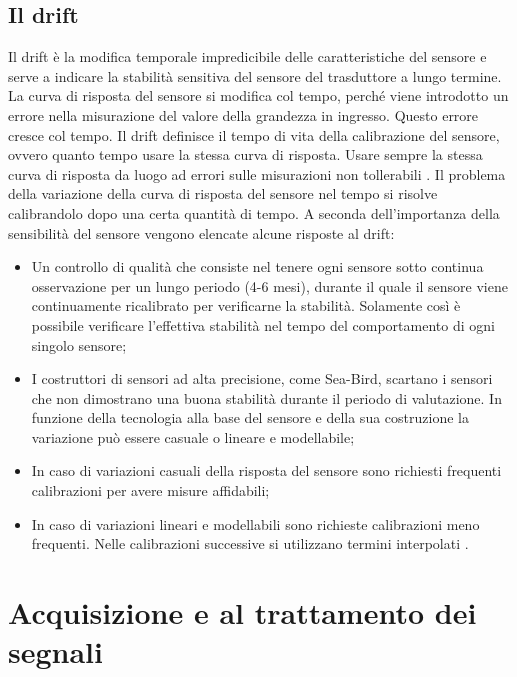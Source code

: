 \documentclass[a4paper]{report} %
\begin{document}
\subsection{Il drift}
Il drift è la modifica temporale impredicibile delle caratteristiche del sensore e serve a indicare la stabilità sensitiva del sensore del trasduttore a lungo termine. La curva di risposta del sensore si modifica col tempo, perché viene introdotto un errore nella misurazione del valore della grandezza in ingresso. Questo errore cresce col tempo. Il drift definisce il tempo di vita della calibrazione del sensore, ovvero quanto tempo usare la stessa curva di risposta. Usare sempre la stessa curva di risposta da luogo ad errori sulle misurazioni non tollerabili \cite{art:rif.14}. 
Il problema della variazione della curva di risposta del sensore nel tempo si risolve calibrandolo dopo una certa quantità di tempo. A seconda dell'importanza della sensibilità del sensore vengono elencate alcune risposte al drift:
\begin{itemize}
\item Un controllo di qualità che consiste nel tenere ogni sensore sotto continua osservazione per un lungo periodo (4-6 mesi), durante il quale il sensore viene continuamente ricalibrato per verificarne la stabilità. Solamente così è possibile verificare l'effettiva stabilità nel tempo del comportamento di ogni singolo sensore;
\item I costruttori di sensori ad alta precisione, come Sea-Bird, scartano i sensori che non dimostrano una buona stabilità durante il periodo di valutazione. In funzione della tecnologia alla base del sensore e della sua costruzione la variazione può essere casuale o lineare e modellabile;
\item In caso di variazioni casuali della risposta del sensore sono richiesti frequenti calibrazioni per avere misure affidabili;
\item In caso di variazioni lineari e modellabili sono richieste calibrazioni meno frequenti. Nelle calibrazioni successive si utilizzano termini interpolati \cite{art:rif.15}.  
\end{itemize}

\section{Acquisizione e al trattamento dei segnali}
\end{document}
